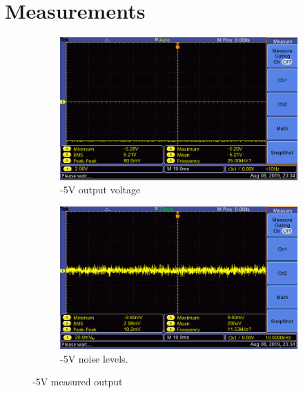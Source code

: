 \section{Measurements} \label{sec:measurements_chargepump}
\begin{figure} 
 \centering
 
    \begin{subfigure}[]{0.49\linewidth}
        \centering
        \includegraphics[width=1.\linewidth,clip, trim = 0cm 0cm 2.5cm 0cm]{./Figures/-5v_test}
        \caption{-5V output voltage}
        \label{fig:-5v_output_measurement}
    \end{subfigure}
    \begin{subfigure}[]{0.49\linewidth}
        \centering
        \includegraphics[width=1.\linewidth,clip, trim = 0cm 0cm 2.5cm 0cm]{./Figures/-5v_noise_test}
        \caption{-5V noise levels.}
        \label{fig:-5v_noise_measurement}
    \end{subfigure}
    
\caption{-5V measured output}
\label{fig:-5v_measurement_box}
\end{figure}









